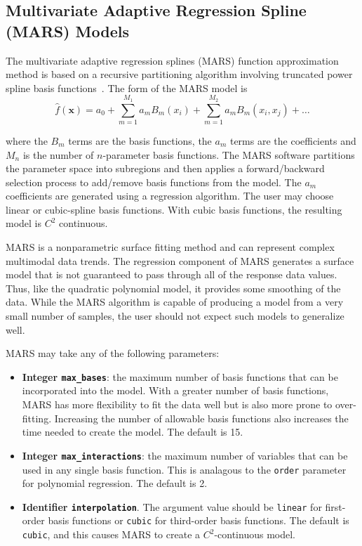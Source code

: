 \documentclass{article}
\begin{document}
\subsection{Multivariate Adaptive Regression Spline (MARS) Models}\label{models:surf:mars}

The multivariate adaptive regression splines (MARS) function approximation method is based on a recursive partitioning algorithm involving truncated power spline basis functions~\cite{friedman}.  The form of the MARS model is
\begin{equation}
  \hat{f}(\mathbf{x})= a_0 + \sum_{m=1}^{M_1}a_{m}B_{m}(x_i) +  \sum_{m=1}^{M_2}a_{m}B_{m}(x_i,x_j)+\ldots
  \label{models:surf:equation10}  
\end{equation}

where the $B_{m}$ terms are the basis functions, the $a_{m}$ terms are the coefficients and $M_n$ is the number of $n$-parameter basis functions. The MARS software partitions the parameter space into subregions and then
applies a forward/backward selection process to add/remove basis functions from the model.  The $a_m$ coefficients are generated using a regression algorithm.  The user may choose linear or cubic-spline basis functions.  With cubic basis functions, the resulting model is $C^2$ continuous.  

MARS is a nonparametric surface fitting method and can represent
complex multimodal data trends. The regression component of MARS
generates a surface model that is not guaranteed to pass through all
of the response data values. Thus, like the quadratic polynomial
model, it provides some smoothing of the data.  While the MARS algorithm is capable of producing a model from a very small number of samples, the user should not expect such models to generalize well.   

MARS may take any of the following parameters:
\begin{itemize}
\item {\bf Integer \texttt{max\_bases}}: the maximum number of basis functions that can be incorporated into the model.  With a greater number of basis functions, MARS has more flexibility to fit the data well but is also more prone to over-fitting.  Increasing the number of allowable basis functions also increases the time needed to create the model.  The default is 15.
\item {\bf Integer \texttt{max\_interactions}}: the maximum number of variables that can be used in any single basis function.  This is analagous to the \texttt{order} parameter for polynomial regression.  The default is 2.
\item {\bf Identifier \texttt{interpolation}}.  The argument value should be \texttt{linear} for first-order basis functions or \texttt{cubic} for third-order basis functions.  The default is \texttt{cubic}, and this causes MARS to create a $C^2$-continuous model.
\end{itemize}
\end{document}
